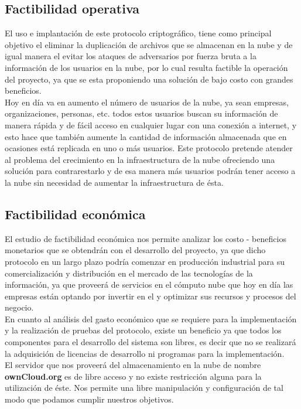 \subsection{Factibilidad operativa}
El uso e implantación de este protocolo criptográfico, tiene como principal objetivo el eliminar la duplicación de archivos que se almacenan en la nube y de igual manera el evitar los ataques de adversarios por fuerza bruta a la información de los usuarios en la nube, por lo cual resulta factible la operación del proyecto, ya que se esta proponiendo una solución de bajo costo con grandes beneficios.\\
Hoy en día va en aumento el número de usuarios de la nube, ya sean empresas, organizaciones, personas, etc. todos estos usuarios buscan su información de manera rápida y de fácil acceso en cualquier lugar con una conexión a internet, y esto hace que también aumente la cantidad de información almacenada que en ocasiones está replicada en uno o más usuarios.
Este protocolo pretende atender al problema del crecimiento en la infraestructura de la nube ofreciendo una solución para contrarestarlo y de esa manera más usuarios podrán tener acceso a la nube sin necesidad de aumentar la infraestructura de ésta.

\subsection{Factibilidad económica}
El estudio de factibilidad económica nos permite analizar los costo - beneficios monetarios que se obtendrán con el desarrollo del proyecto, ya que dicho protocolo en un largo plazo podría comenzar en producción industrial para su comercialización y distribución en el mercado de las tecnologías de la información, ya que proveerá de servicios en el cómputo nube que hoy en día las empresas están optando por invertir en el y optimizar sus recursos y procesos del negocio. \\

En cuanto al análisis del gasto económico que se requiere para la implementación y la realización de pruebas del protocolo, existe un beneficio ya que todos los componentes para el desarrollo del sistema son libres, es decir que no se realizará la adquisición de licencias de desarrollo ni programas para la implementación. 
\\ El servidor que nos proveerá del almacenamiento en la nube de nombre \textbf{ownCloud.org} es de libre acceso y no existe restricción alguna para la utilización de éste. Nos permite una libre manipulación y configuración de tal modo que podamos cumplir nuestros objetivos.

